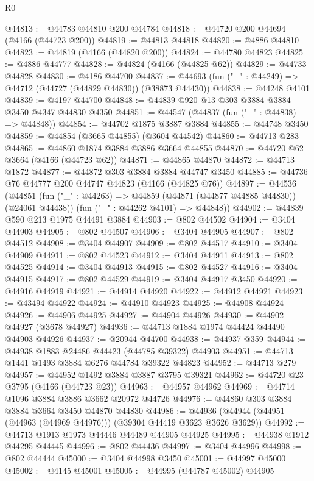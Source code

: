 \begin{lexlean}{R0}
\begin{coremodule}
@44813 := @44783 @44810 @200 @44784
@44818 := @44720 @200 @44694 (@4166 (@44723 @200))
@44819 := @44813 @44818
@44820 := @4886 @44810
@44823 := @44819 (@4166 (@44820 @200))
@44824 := @44780 @44823
@44825 := @4886 @44777
@44828 := @44824 (@4166 (@44825 @62))
@44829 := @44733 @44828
@44830 := @4186 @44700
@44837 := @44693 (fun ("_" : @44249) => @44712 (@44727 (@44829 @44830)) (@38873 @44430))
@44838 := @44248 @4101
@44839 := @4197 @44700
@44848 := @44839 @920 @13 @303 @3884 @3884 @3450 @4347 @44830 @4350
@44851 := @44547 (@44837 (fun ("_" : @44838) => @44848))
@44854 := @44702 @1875 @3887 @3884
@44855 := @44748 @3450
@44859 := @44854 (@3665 @44855) (@3604 @44542)
@44860 := @44713 @283
@44865 := @44860 @1874 @3884 @3886 @3664 @44855
@44870 := @44720 @62 @3664 (@4166 (@44723 @62))
@44871 := @44865 @44870
@44872 := @44713 @1872
@44877 := @44872 @303 @3884 @3884 @44747 @3450
@44885 := @44736 @76 @44777 @200 @44747 @44823 (@4166 (@44825 @76))
@44897 := @44536
    (@44851
      (fun ("_" : @44263) => @44859 (@44871 (@44877 @44885 @44830)) (@24061 @44438))
      (fun ("_" : @44262 @4101) => @44848))
@44902 := @44839 @590 @213 @1975 @44491 @3884
@44903 := @802 @44502
@44904 := @3404 @44903
@44905 := @802 @44507
@44906 := @3404 @44905
@44907 := @802 @44512
@44908 := @3404 @44907
@44909 := @802 @44517
@44910 := @3404 @44909
@44911 := @802 @44523
@44912 := @3404 @44911
@44913 := @802 @44525
@44914 := @3404 @44913
@44915 := @802 @44527
@44916 := @3404 @44915
@44917 := @802 @44529
@44919 := @3404 @44917 @3450
@44920 := @44916 @44919
@44921 := @44914 @44920
@44922 := @44912 @44921
@44923 := @43494 @44922
@44924 := @44910 @44923
@44925 := @44908 @44924
@44926 := @44906 @44925
@44927 := @44904 @44926
@44930 := @44902 @44927 (@3678 @44927)
@44936 := @44713 @1884 @1974 @44424 @44490 @44903 @44926
@44937 := @20944 @44700
@44938 := @44937 @359
@44944 := @44938 @1883 @24486 @44423 (@44785 @39322) @44903
@44951 := @44713 @1441 @1493 @3884 @6276 @44784 @39322 @44823
@44952 := @44713 @279
@44957 := @44952 @1492 @3884 @3887 @3795 @39321
@44962 := @44720 @23 @3795 (@4166 (@44723 @23))
@44963 := @44957 @44962
@44969 := @44714 @1096 @3884 @3886 @3662 @20972 @44726
@44976 := @44860 @303 @3884 @3884 @3664 @3450 @44870 @44830
@44986 := @44936 (@44944 (@44951 (@44963 (@44969 @44976))) (@39304 @44419 @3623 @3626 @3629))
@44992 := @44713 @1913 @1973 @44446 @44489 @44905 @44925
@44995 := @44938 @1912 @44295 @44445
@44996 := @802 @44436
@44997 := @3404 @44996
@44998 := @802 @44444
@45000 := @3404 @44998 @3450
@45001 := @44997 @45000
@45002 := @4145 @45001
@45005 := @44995 (@44787 @45002) @44905

\end{coremodule}
\end{lexlean}

